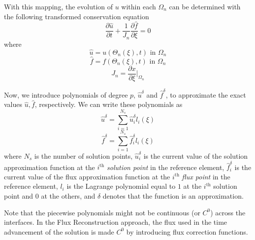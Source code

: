 With this mapping, the evolution of $u$ within each $\Omega_n$ can be determined with the following 
transformed conservation equation
\begin{equation}
\frac{\partial \hat{u}}{\partial t} + \frac{1}{J_n}\frac{\partial \hat{f}}{\partial \xi} = 0
\end{equation}
where
\begin{equation}
\hat{u} = u(\Theta_n(\xi),t) \text{ in } \Omega_n
\end{equation}
\begin{equation}
\hat{f} = f(\Theta_n(\xi),t) \text{ in } \Omega_n
\end{equation}
\begin{equation}
J_n = \frac{\partial x}{\partial \xi} \bigg|_{\Omega_n}
\end{equation}

Now, we introduce polynomials of degree $p$, $\hat{u}^\delta$ and $\hat{f}^\delta$, to approximate the exact values $\hat{u},\hat{f}$, respectively. We can write these polynomials as
\begin{equation}
\hat{u}^\delta = \sum_{i=1}^{N_s} \hat{u}_i^\delta l_i(\xi)
\end{equation}
\begin{equation}
\hat{f}^\delta = \sum_{i=1}^{N_s} \hat{f}_i^\delta l_i(\xi)
\end{equation}
where $N_s$ is the number of solution points, $\hat{u}_i^\delta$ is the current value of the 
solution approximation function at the $i^\text{th}$ \emph{solution point} in the reference element, 
$\hat{f}_i^\delta$ is the current value of the flux approximation function at the $i^\text{th}$ 
\emph{flux point} in the reference element, $l_i$ is the Lagrange polynomial equal to $1$ at the 
$i^\text{th}$ solution point and $0$ at the others, and $\delta$ denotes that the function is an 
approximation.

Note that the piecewise polynomials might not be continuous (or $C^0$) across the interfaces. In the 
Flux Reconstruction approach, the flux used in the time advancement of the solution is made $C^0$ 
by introducing flux correction functions.

